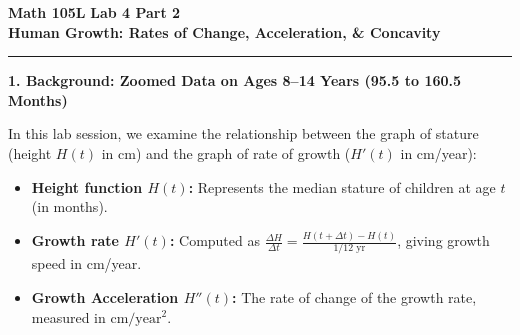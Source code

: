 \documentclass[10.5pt]{article}
\begin{document}
\noindent \textbf{\large Math 105L} \hfill \textbf{\large Lab 4 Part 2}\\[1pt]
{\textbf{\Large Human Growth: Rates of Change, Acceleration, \& Concavity}}\\[-5pt]
\rule{\textwidth}{1.2pt}

\vspace{0.03in}

\textbf{\large 1. Background: Zoomed Data on Ages 8--14 Years (95.5 to 160.5 Months)}

In this lab session, we examine the relationship between the graph of stature (height $H(t)$ in cm) and the graph of rate of growth ($H'(t)$ in cm/year):
\begin{itemize}[leftmargin=1.2em, topsep=1pt, itemsep=2pt]
  \item \textbf{Height function $H(t)$:} Represents the median stature of children at age $t$ (in months).
  \item \textbf{Growth rate $H'(t)$:} Computed as $\frac{\Delta H}{\Delta t} = \frac{H(t+\Delta t) - H(t)}{1/12 \text{ yr}}$, giving growth speed in cm/year.
  \item \textbf{Growth Acceleration $H''(t)$:} The rate of change of the growth rate, measured in $\text{cm}/\text{year}^2$.
\end{itemize}

\vspace{0.03in}
\end{document}
